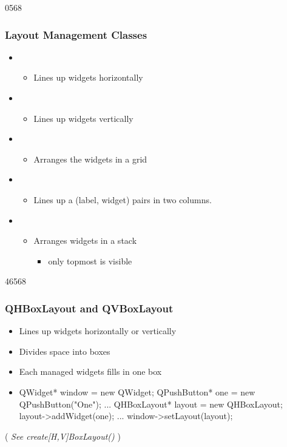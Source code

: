 \begin{slide}{0568}\frametitle{Layout Management Classes}
\begin{itemize} 
\item {} 
  \begin{itemize}
  \item Lines up widgets horizontally 
  \end{itemize}
\item {}
  \begin{itemize}
  \item Lines up widgets vertically
  \end{itemize}
\item {} 
  \begin{itemize}
  \item Arranges the widgets in a grid
  \end{itemize}
\item {} 
  \begin{itemize}
  \item Lines up a (label, widget) pairs in two columns.
  \end{itemize}
\item {} 
  \begin{itemize}
  \item Arranges widgets in a stack
    \begin{itemize}
	    \item only topmost is visible
  \end{itemize}
\end{itemize}
\end{itemize}
\end{slide}


\begin{slide}[fragile]{46568}
  \frametitle{QHBoxLayout and QVBoxLayout}
  \begin{itemize}
  \item Lines up widgets horizontally or vertically
  \item Divides space into boxes
  \item Each managed widgets fills in one box
  \end{itemize}
  \begin{itemize}
  \item[] \begin{cpp}
QWidget* window = new QWidget;
QPushButton* one = new QPushButton("One");
...
QHBoxLayout* layout = new QHBoxLayout;
layout->addWidget(one);
...
window->setLayout(layout);
  \end{cpp}               
  \end{itemize}
   ( \textit{See create[H,V]BoxLayout()} )
\end{slide}

